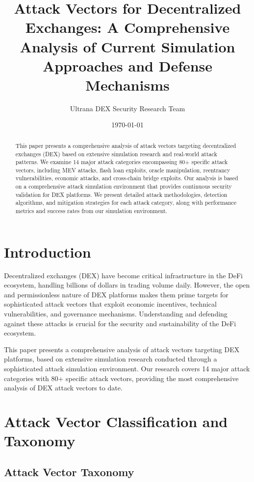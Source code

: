 \documentclass[11pt,a4paper]{article}
\title{\textbf{Attack Vectors for Decentralized Exchanges: A Comprehensive Analysis of Current Simulation Approaches and Defense Mechanisms}}
\author{Ultrana DEX Security Research Team}
\date{\today}
\begin{document}
\maketitle

\begin{abstract}
This paper presents a comprehensive analysis of attack vectors targeting decentralized exchanges (DEX) based on extensive simulation research and real-world attack patterns. We examine 14 major attack categories encompassing 80+ specific attack vectors, including MEV attacks, flash loan exploits, oracle manipulation, reentrancy vulnerabilities, economic attacks, and cross-chain bridge exploits. Our analysis is based on a comprehensive attack simulation environment that provides continuous security validation for DEX platforms. We present detailed attack methodologies, detection algorithms, and mitigation strategies for each attack category, along with performance metrics and success rates from our simulation environment.
\end{abstract}

\section{Introduction}

Decentralized exchanges (DEX) have become critical infrastructure in the DeFi ecosystem, handling billions of dollars in trading volume daily. However, the open and permissionless nature of DEX platforms makes them prime targets for sophisticated attack vectors that exploit economic incentives, technical vulnerabilities, and governance mechanisms. Understanding and defending against these attacks is crucial for the security and sustainability of the DeFi ecosystem.

This paper presents a comprehensive analysis of attack vectors targeting DEX platforms, based on extensive simulation research conducted through a sophisticated attack simulation environment. Our research covers 14 major attack categories with 80+ specific attack vectors, providing the most comprehensive analysis of DEX attack vectors to date.

\section{Attack Vector Classification and Taxonomy}

\subsection{Attack Vector Taxonomy}
\end{document}
